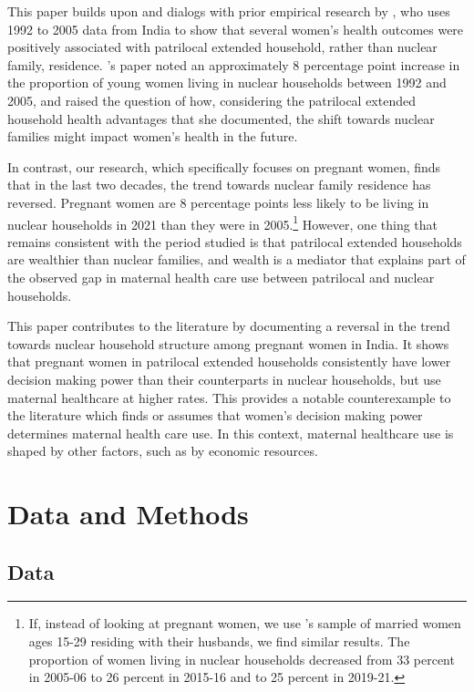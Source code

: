 \documentclass[12pt]{article}
\begin{document}
This paper builds upon and dialogs with prior empirical research by \cite{allendorf2013going}, who uses 1992 to 2005 data from India to show that several women's health outcomes were positively associated with patrilocal extended household, rather than nuclear family, residence.  \cite{allendorf2013going}'s paper noted an approximately 8 percentage point increase in the proportion of young women living in nuclear households between 1992 and 2005, and raised the question of how, considering the patrilocal extended household health advantages that she documented, the shift towards nuclear families might impact women's health in the future.  

In contrast, our research, which specifically focuses on pregnant women, finds that in the last two decades, the trend towards nuclear family residence has reversed. Pregnant women are 8 percentage points less likely to be living in nuclear households in 2021 than they were in 2005.\footnote{If, instead of looking at pregnant women, we use \cite{allendorf2013going}'s sample of married women ages 15-29 residing with their husbands, we find similar results.  The proportion of women living in nuclear households decreased from 33 percent in 2005-06 to 26 percent in 2015-16 and to 25 percent in 2019-21.}  However, one thing that remains consistent with the period \cite{allendorf2013going} studied is that patrilocal extended households are wealthier than nuclear families, and wealth is a mediator that explains part of the observed gap in maternal health care use between patrilocal and nuclear households. 

This paper contributes to the literature by documenting a reversal in the trend towards nuclear household structure among pregnant women in India. It shows that pregnant women in patrilocal extended households consistently have lower decision making power than their counterparts in nuclear households, but use maternal healthcare at higher rates. This provides a notable counterexample to the literature which finds or assumes that women's decision making power determines maternal health care use.  In this context, maternal healthcare use is shaped by other factors, such as by economic resources.

\section{Data and Methods}

\subsection{Data} \label{sec:data}
\end{document}
